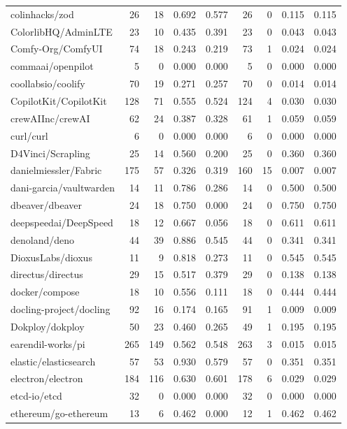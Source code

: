 \begin{tabular}{lrrrrrrrr}
colinhacks/zod & 26 & 18 & 0.692 & 0.577 & 26 & 0 & 0.115 & 0.115 \\
ColorlibHQ/AdminLTE & 23 & 10 & 0.435 & 0.391 & 23 & 0 & 0.043 & 0.043 \\
Comfy-Org/ComfyUI & 74 & 18 & 0.243 & 0.219 & 73 & 1 & 0.024 & 0.024 \\
commaai/openpilot & 5 & 0 & 0.000 & 0.000 & 5 & 0 & 0.000 & 0.000 \\
coollabsio/coolify & 70 & 19 & 0.271 & 0.257 & 70 & 0 & 0.014 & 0.014 \\
CopilotKit/CopilotKit & 128 & 71 & 0.555 & 0.524 & 124 & 4 & 0.030 & 0.030 \\
crewAIInc/crewAI & 62 & 24 & 0.387 & 0.328 & 61 & 1 & 0.059 & 0.059 \\
curl/curl & 6 & 0 & 0.000 & 0.000 & 6 & 0 & 0.000 & 0.000 \\
D4Vinci/Scrapling & 25 & 14 & 0.560 & 0.200 & 25 & 0 & 0.360 & 0.360 \\
danielmiessler/Fabric & 175 & 57 & 0.326 & 0.319 & 160 & 15 & 0.007 & 0.007 \\
dani-garcia/vaultwarden & 14 & 11 & 0.786 & 0.286 & 14 & 0 & 0.500 & 0.500 \\
dbeaver/dbeaver & 24 & 18 & 0.750 & 0.000 & 24 & 0 & 0.750 & 0.750 \\
deepspeedai/DeepSpeed & 18 & 12 & 0.667 & 0.056 & 18 & 0 & 0.611 & 0.611 \\
denoland/deno & 44 & 39 & 0.886 & 0.545 & 44 & 0 & 0.341 & 0.341 \\
DioxusLabs/dioxus & 11 & 9 & 0.818 & 0.273 & 11 & 0 & 0.545 & 0.545 \\
directus/directus & 29 & 15 & 0.517 & 0.379 & 29 & 0 & 0.138 & 0.138 \\
docker/compose & 18 & 10 & 0.556 & 0.111 & 18 & 0 & 0.444 & 0.444 \\
docling-project/docling & 92 & 16 & 0.174 & 0.165 & 91 & 1 & 0.009 & 0.009 \\
Dokploy/dokploy & 50 & 23 & 0.460 & 0.265 & 49 & 1 & 0.195 & 0.195 \\
earendil-works/pi & 265 & 149 & 0.562 & 0.548 & 263 & 3 & 0.015 & 0.015 \\
elastic/elasticsearch & 57 & 53 & 0.930 & 0.579 & 57 & 0 & 0.351 & 0.351 \\
electron/electron & 184 & 116 & 0.630 & 0.601 & 178 & 6 & 0.029 & 0.029 \\
etcd-io/etcd & 32 & 0 & 0.000 & 0.000 & 32 & 0 & 0.000 & 0.000 \\
ethereum/go-ethereum & 13 & 6 & 0.462 & 0.000 & 12 & 1 & 0.462 & 0.462 \\

\end{tabular}
